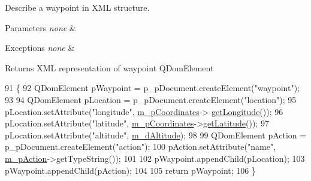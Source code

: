 Describe a waypoint in X\-M\-L structure. 


\begin{DoxyParams}{Parameters}
{\em none} & \\
\hline
\end{DoxyParams}

\begin{DoxyExceptions}{Exceptions}
{\em none} & \\
\hline
\end{DoxyExceptions}
\begin{DoxyReturn}{Returns}
X\-M\-L representation of waypoint Q\-Dom\-Element 
\end{DoxyReturn}

\begin{DoxyCode}
91 \{
92     QDomElement pWaypoint = p\_pDocument.createElement(\textcolor{stringliteral}{"waypoint"});
93 
94     QDomElement pLocation = p\_pDocument.createElement(\textcolor{stringliteral}{"location"});
95     pLocation.setAttribute(\textcolor{stringliteral}{"longitude"}, \hyperlink{a00017_a1900c34e2c85593efdee3d7436c508b3}{m\_pCoordinates}->
      \hyperlink{a00006_aeca2669cb6715159606e844ab6a77bbf}{getLongitude}());
96     pLocation.setAttribute(\textcolor{stringliteral}{"latitude"}, \hyperlink{a00017_a1900c34e2c85593efdee3d7436c508b3}{m\_pCoordinates}->\hyperlink{a00006_a555fe9c52a678f22d66b31358566cfe9}{getLatitude}());
97     pLocation.setAttribute(\textcolor{stringliteral}{"altitude"}, \hyperlink{a00017_a79a2bd07a373f3b0042e6c2dc0e51fc0}{m\_dAltitude});
98     
99     QDomElement pAction = p\_pDocument.createElement(\textcolor{stringliteral}{"action"});
100     pAction.setAttribute(\textcolor{stringliteral}{"name"}, \hyperlink{a00017_a63916589fa097ccd19239948429b55f7}{m\_pAction}->getTypeString());
101 
102     pWaypoint.appendChild(pLocation);
103     pWaypoint.appendChild(pAction);
104 
105     \textcolor{keywordflow}{return} pWaypoint;
106 \}
\end{DoxyCode}


